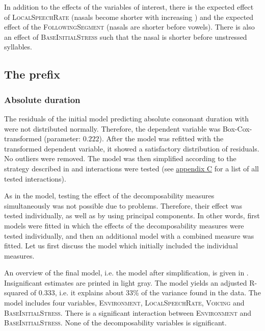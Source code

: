 In addition to the effects of the variables of interest, there is the expected effect of \textsc{LocalSpeechRate} (nasals become shorter with increasing ) and the expected effect of the \textsc{FollowingSegment} (nasals are shorter before vowels). There is also an effect of \textsc{BaseInitialStress} such that the nasal is shorter before unstressed syllables.

\subsection{The prefix } \label{corpus results dis}


\subsubsection{Absolute duration}

The residuals of the initial model predicting absolute consonant duration with  were not distributed normally. Therefore, the dependent variable was Box-Cox-transformed (parameter:  $0.222$). After the model was refitted with the transformed dependent variable, it showed a satisfactory distribution of residuals. No outliers were removed. The model was then simplified according to the strategy described in   and interactions were tested (see \hyperref[Appendix C: Summaries of tested interactions in corpus study]{appendix C} for a list of all tested interactions).

As in the model, testing the effect of the decomposability measures simultaneously was not possible due to  problems. Therefore, their effect was tested individually, as well as by using principal components. In other words, first models were fitted in which the effects of the decomposability measures were tested individually, and then an additional model with a combined  measure was fitted. 
 Let us first discuss the model which initially included the individual measures.

An overview of the final model, i.e. the model after simplification, is given in . Insignificant estimates are printed in light gray. The model yields an adjusted R-squared of  0.333, i.e. it explains about 33\% of the variance found in the data. The model includes four variables, \textsc{Environment}, \textsc{LocalSpeechRate}, \textsc{Voicing} and \textsc{BaseInitialStress}. There is a significant interaction between \textsc{Environment} and \textsc{BaseInitialStress}. None of the decomposability variables is significant.


